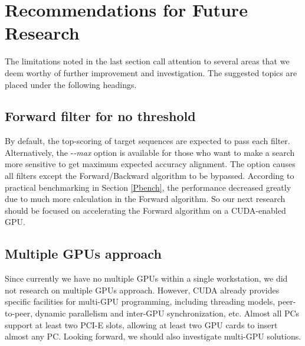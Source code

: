 
\section{Recommendations for Future Research}
The limitations noted in the last section call attention to several areas that we deem worthy of further improvement and investigation. The suggested topics are placed under the following headings.

\subsection*{Forward filter for no threshold}
By default, the top-scoring of target sequences are expected to pass each filter. Alternatively, the -\emph{-max} option is available for those who want to make a search more sensitive to get maximum expected accuracy alignment. The option causes all filters except the Forward/Backward algorithm to be bypassed. According to practical benchmarking in Section \ref{Pbench}, the performance decreased greatly due to much more calculation in the Forward algorithm. So our next research should be focused on accelerating the Forward algorithm on a CUDA-enabled GPU.

\subsection*{Multiple GPUs approach}
Since currently we have no multiple GPUs within a single workstation, we did not research on multiple GPUs approach. However, CUDA already provides specific facilities for multi-GPU programming, including threading models, peer-to-peer, dynamic parallelism and inter-GPU synchronization, etc. Almost all PCs support at least two PCI-E slots, allowing at least two GPU cards to insert almost any PC. Looking forward, we should also investigate multi-GPU solutions.

